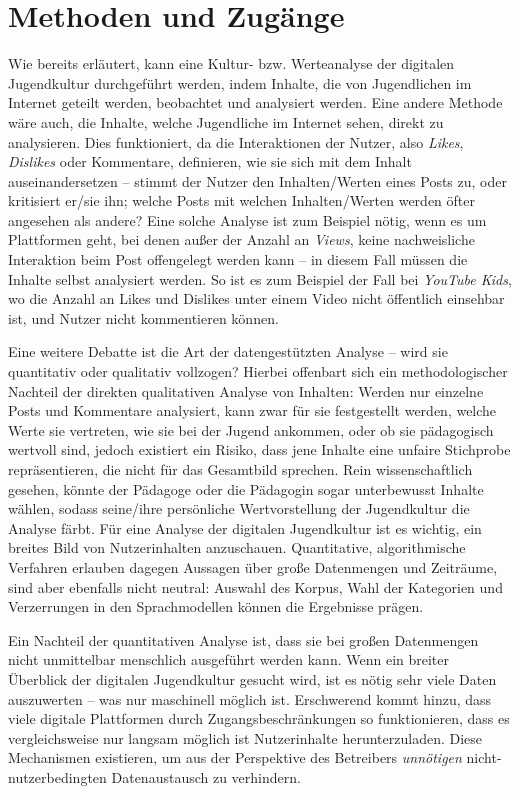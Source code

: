 \section{Methoden und Zugänge} \label{sec:2}
Wie bereits erläutert, kann eine Kultur- bzw. Werteanalyse der digitalen Jugendkultur durchgeführt werden, indem Inhalte, die von Jugendlichen im Internet geteilt werden, beobachtet und analysiert werden.
Eine andere Methode wäre auch, die Inhalte, welche Jugendliche im Internet sehen, direkt zu analysieren.
Dies funktioniert, da die Interaktionen der Nutzer, also \emph{Likes}, \emph{Dislikes} oder Kommentare, definieren, wie sie sich mit dem Inhalt auseinandersetzen -- stimmt der Nutzer den Inhalten/Werten eines Posts zu, oder kritisiert er/sie ihn; welche Posts mit welchen Inhalten/Werten werden öfter angesehen als andere?
Eine solche Analyse ist zum Beispiel nötig, wenn es um Plattformen geht, bei denen außer der Anzahl an \emph{Views}, keine nachweisliche Interaktion beim Post offengelegt werden kann -- in diesem Fall müssen die Inhalte selbst analysiert werden.
So ist es zum Beispiel der Fall bei \emph{YouTube Kids}, wo die Anzahl an Likes und Dislikes unter einem Video nicht öffentlich einsehbar ist, und Nutzer nicht kommentieren können.

Eine weitere Debatte ist die Art der datengestützten Analyse -- wird sie quantitativ oder qualitativ vollzogen?
Hierbei offenbart sich ein methodologischer Nachteil der direkten qualitativen Analyse von Inhalten:
Werden nur einzelne Posts und Kommentare analysiert, kann zwar für sie festgestellt werden, welche Werte sie vertreten, wie sie bei der Jugend ankommen, oder ob sie pädagogisch wertvoll sind, jedoch existiert ein Risiko, dass jene Inhalte eine unfaire Stichprobe repräsentieren, die nicht für das Gesamtbild sprechen.
Rein wissenschaftlich gesehen, könnte der Pädagoge oder die Pädagogin sogar unterbewusst Inhalte wählen, sodass seine/ihre persönliche Wertvorstellung der Jugendkultur die Analyse färbt.
Für eine Analyse der digitalen Jugendkultur ist es wichtig, ein breites Bild von Nutzerinhalten anzuschauen.
Quantitative, algorithmische Verfahren erlauben dagegen Aussagen über große Datenmengen und Zeiträume, sind aber ebenfalls nicht neutral: Auswahl des Korpus, Wahl der Kategorien und Verzerrungen in den Sprachmodellen können die Ergebnisse prägen.

Ein Nachteil der quantitativen Analyse ist, dass sie bei großen Datenmengen nicht unmittelbar menschlich ausgeführt werden kann.
Wenn ein breiter Überblick der digitalen Jugendkultur gesucht wird, ist es nötig sehr viele Daten auszuwerten -- was nur maschinell möglich ist.
Erschwerend kommt hinzu, dass viele digitale Plattformen durch Zugangsbeschränkungen so funktionieren, dass es vergleichsweise nur langsam möglich ist Nutzerinhalte herunterzuladen.
Diese Mechanismen existieren, um aus der Perspektive des Betreibers \emph{unnötigen} nicht-nutzerbedingten Datenaustausch zu verhindern.


